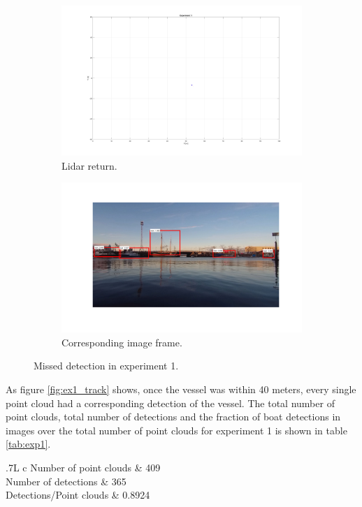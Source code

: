 \begin{figure}[H]
	\centering
	\begin{subfigure}[t]{.5\textwidth}
		\centering
		\includegraphics[width=\linewidth]{fig/exp1_50m.png}
		\caption{Lidar return.}
		\label{fig:sub_ex1_50m}
	\end{subfigure}%
	\begin{subfigure}[t]{.5\textwidth}
		\centering
		\includegraphics[width=\linewidth]{fig/exp1_bb_50m.png}
		\caption{Corresponding image frame.}
		\label{fig:sub_ex1_bb_50m}
	\end{subfigure}
	\caption{Missed detection in experiment 1.}
	\label{fig:ex1_50m}
\end{figure}
As figure \ref{fig:ex1_track} shows, once the vessel was within 40 meters, every single point cloud had a corresponding detection of the vessel. The total number of point clouds, total number of detections and the fraction of boat detections in images over the total number of point clouds for experiment 1 is shown in table \ref{tab:exp1}.
\begin{table}[H]
	\centering
	\begin{tabularx}{.7\linewidth}{L c}
		\toprule
		Number of point clouds & 409\\
		\midrule
		Number of detections & 365\\
		\midrule
	    Detections/Point clouds & 0.8924 \\
		\bottomrule
	\end{tabularx}
\caption{Data from experiment 1.}
\label{tab:exp1}
\end{table}
